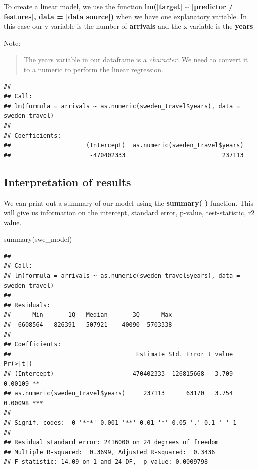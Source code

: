 \documentclass[
]{book}
\newenvironment{Shaded}{\begin{snugshade}}{\end{snugshade}}
\newcommand{\AttributeTok}[1]{\textcolor[rgb]{0.77,0.63,0.00}{#1}}
\newcommand{\FunctionTok}[1]{\textcolor[rgb]{0.00,0.00,0.00}{#1}}
\newcommand{\NormalTok}[1]{#1}
\newcommand{\OtherTok}[1]{\textcolor[rgb]{0.56,0.35,0.01}{#1}}
\newcommand{\SpecialCharTok}[1]{\textcolor[rgb]{0.00,0.00,0.00}{#1}}
\begin{document}
To create a linear model, we use the function \textbf{lm({[}target{]} \textasciitilde{} {[}predictor / features{]}, data = {[}data source{]})} when we have one explanatory variable. In this case our y-variable is the number of \textbf{arrivals} and the x-variable is the \textbf{years}

Note:

\begin{quote}
The years variable in our dataframe is a \emph{character}. We need to convert it to a numeric to perform the linear regression.
\end{quote}

\begin{Shaded}
\end{Shaded}

\begin{verbatim}
## 
## Call:
## lm(formula = arrivals ~ as.numeric(sweden_travel$years), data = sweden_travel)
## 
## Coefficients:
##                     (Intercept)  as.numeric(sweden_travel$years)  
##                      -470402333                           237113
\end{verbatim}

\hypertarget{interpretation-of-results}{%
\subsection{Interpretation of results}\label{interpretation-of-results}}

We can print out a summary of our model using the \textbf{summary( )} function. This will give us information on the intercept, standard error, p-value, test-statistic, r2 value.

\begin{Shaded}
\begin{Highlighting}[]
\FunctionTok{summary}\NormalTok{(swe\_model)}
\end{Highlighting}
\end{Shaded}

\begin{verbatim}
## 
## Call:
## lm(formula = arrivals ~ as.numeric(sweden_travel$years), data = sweden_travel)
## 
## Residuals:
##      Min       1Q   Median       3Q      Max 
## -6608564  -826391  -507921   -40090  5703338 
## 
## Coefficients:
##                                   Estimate Std. Error t value Pr(>|t|)    
## (Intercept)                     -470402333  126815668  -3.709  0.00109 ** 
## as.numeric(sweden_travel$years)     237113      63170   3.754  0.00098 ***
## ---
## Signif. codes:  0 '***' 0.001 '**' 0.01 '*' 0.05 '.' 0.1 ' ' 1
## 
## Residual standard error: 2416000 on 24 degrees of freedom
## Multiple R-squared:  0.3699, Adjusted R-squared:  0.3436 
## F-statistic: 14.09 on 1 and 24 DF,  p-value: 0.0009798
\end{verbatim}
\end{document}

